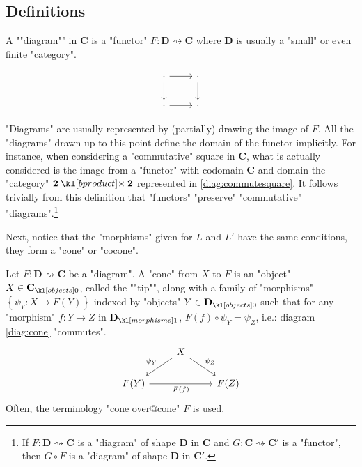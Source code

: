 \documentclass[main.tex]{subfiles}
\begin{document}
\subsection{Definitions}%
\begin{defn}[Diagram]\label{defn:diagram}
    \AP A ""diagram"" in $\mathbf{C}$ is a "functor" $F:\mathbf{D}\rightsquigarrow \mathbf{C}$ where $\mathbf{D}$ is usually a "small" or even finite "category".
\end{defn}
\begin{rem}
\begin{marginfigure}
    \begin{equation}\label{diag:commsquare}
        \begin{tikzcd}
            \cdot \arrow[r] \arrow[d] & \cdot \arrow[d] \\
            \cdot \arrow[r] & \cdot
        \end{tikzcd}
    \end{equation}
\end{marginfigure}
"Diagrams" are usually represented by (partially) drawing the image of $F$. All the "diagrams" drawn up to this point define the domain of the functor implicitly. For instance, when considering a "commutative" square in $\mathbf{C}$, what is actually considered is the image from a "functor" with codomain $\mathbf{C}$ and domain the "category" $\mathbf{2}\product \mathbf{2}$ represented in \eqref{diag:commutesquare}. It follows trivially from this definition that "functors" "preserve" "commutative" "diagrams".\footnote{If $F: \mathbf{D} \rightsquigarrow \mathbf{C}$ is a "diagram" of shape $\mathbf{D}$ in $\mathbf{C}$ and $G: \mathbf{C}\rightsquigarrow \mathbf{C}'$ is a "functor", then $G\circ F$ is a "diagram" of shape $\mathbf{D}$ in $\mathbf{C}'$.}
\end{rem}
Next, notice that the "morphisms" given for $L$ and $L'$ have the same conditions, they form a "cone" or "cocone".
\begin{defn}[Cone]
    Let $F: \mathbf{D}\rightsquigarrow \mathbf{C}$ be a "diagram". \AP A "cone" from $X$ to $F$ is an "object" $X \in \obj{\mathbf{C}}$, called the ""tip"", along with a family of "morphisms" $\left\{ \psi_Y: X \rightarrow F(Y)\right\}$ indexed by "objects" $Y \in \obj{\mathbf{D}}$ such that for any "morphism" $f:Y \rightarrow Z$ in $\mor{\mathbf{D}}$, $F(f) \circ \psi_Y = \psi_Z$, i.e.: diagram \eqref{diag:cone} "commutes".
    \begin{equation}\label{diag:cone}
        \begin{tikzcd}
            & X \arrow[ld, "\psi_Y"'] \arrow[rd, "\psi_Z"] &\\
            F(Y)\arrow[rr, "F(f)"'] & & F(Z)
        \end{tikzcd}
    \end{equation}
    Often, the terminology "cone over@cone" $F$ is used.
\end{defn}
\end{document}
